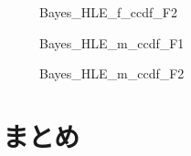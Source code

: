\documentclass[a4j,11pt,mc]{jreport}
\begin{document}
	\begin{figure}[H]
		\begin{center}
				\caption{Bayes\_HLE\_f\_ccdf\_F2}
		\end{center}
	\end{figure}



	\begin{figure}[H]
		\begin{center}
				\caption{Bayes\_HLE\_m\_ccdf\_F1}
		\end{center}
	\end{figure}



	\begin{figure}[H]
		\begin{center}
				\caption{Bayes\_HLE\_m\_ccdf\_F2}
		\end{center}
	\end{figure}



\chapter{まとめ}\label{chapter:decision}
\end{document}
